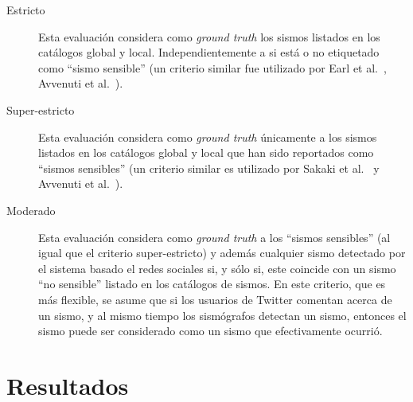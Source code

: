 \begin{description}

\item[Estricto] Esta evaluación considera como \textit{ground truth} los sismos listados en los catálogos global y local. Independientemente a si está o no etiquetado como ``sismo sensible'' (un criterio similar fue utilizado por Earl et al.~\cite{earle2010omg}, Avvenuti et al.~\cite{avvenuti2014earthquake,avvenuti2014ears}).

\item[Super-estricto] Esta evaluación considera como \textit{ground truth} únicamente a los sismos listados en los catálogos global y local que han sido reportados como ``sismos sensibles'' (un criterio similar es utilizado por Sakaki et al.~\cite{sakaki2013tweet} y Avvenuti et al.~\cite{avvenuti2014earthquake,avvenuti2014ears}).

\item[Moderado] Esta evaluación considera como \textit{ground truth} a los ``sismos sensibles'' (al igual que el criterio super-estricto) y además cualquier sismo detectado por el sistema basado el redes sociales si, y sólo si, este coincide con un sismo ``no sensible'' listado en los catálogos de sismos. En este criterio, que es más flexible, se asume que si los usuarios de Twitter comentan acerca de un sismo, y al mismo tiempo los sismógrafos detectan un sismo, entonces el sismo puede ser considerado como un sismo que efectivamente ocurrió.

\end{description} 

\section{Resultados}
\label{sec:results}

